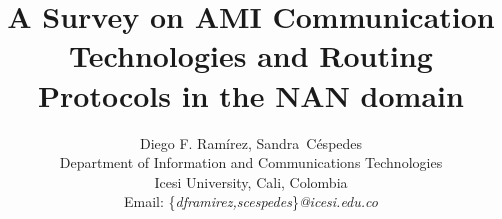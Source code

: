 \documentclass[11pt,draftclsnofoot,onecolumn]{IEEEtran}
\begin{document}
%
\title{A Survey on AMI Communication Technologies and Routing Protocols in the NAN domain}
%
%
%

\author{Diego F. Ram\'{i}rez, 
			 Sandra~C\'{e}spedes\\%
			 Department of Information and Communications Technologies\\%
			 Icesi University, Cali, Colombia\\%
			 Email: \{\textit{dframirez,scespedes}\}\textit{@icesi.edu.co}}

%
%



%
\end{document}
